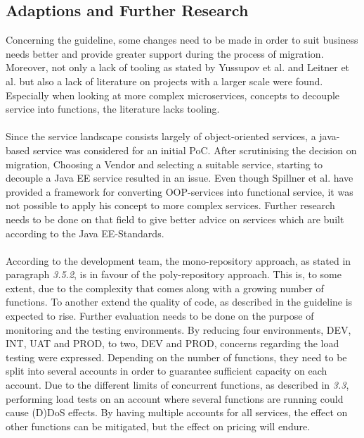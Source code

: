 \documentclass[a4paper,11pt, pagesize]{scrartcl}
\begin{document}
\begin{spacing}{1.2}
\subsection{Adaptions and Further Research}
Concerning the guideline, some changes need to be made in order to suit business needs better and provide greater support during the process of migration. Moreover, not only a lack of tooling as stated by Yussupov et al. and Leitner et al. but also a lack of literature on projects with a larger scale were found. Especially when looking at more complex microservices, concepts to decouple service into functions, the literature lacks tooling. \\\\
Since the service landscape consists largely of object-oriented services, a java-based service was considered for an initial PoC. After scrutinising the decision on migration, Choosing a Vendor and selecting a suitable service, starting to decouple a Java EE service resulted in an issue. Even though Spillner et al. have provided a framework for converting OOP-services into functional service, it was not possible to apply his concept to more complex services. Further research needs to be done on that field to give better advice on services which are built according to the Java EE-Standards. \\\\
According to the development team, the mono-repository approach, as stated in paragraph \textit{3.5.2}, is in favour of the poly-repository approach. This is, to some extent, due to the complexity that comes along with a growing number of functions. To another extend the quality of code, as described in the guideline is expected to rise. Further evaluation needs to be done on the purpose of monitoring and the testing environments. By reducing four environments, DEV, INT, UAT and PROD, to two, DEV and PROD, concerns regarding the load testing were expressed. Depending on the number of functions, they need to be split into several accounts in order to guarantee sufficient capacity on each account. Due to the different limits of concurrent functions, as described in \textit{3.3}, performing load tests on an account where several functions are running could cause (D)DoS effects. By having multiple accounts for all services, the effect on other functions can be mitigated, but the effect on pricing will endure.  
\newpage

\end{spacing}
\end{document}
